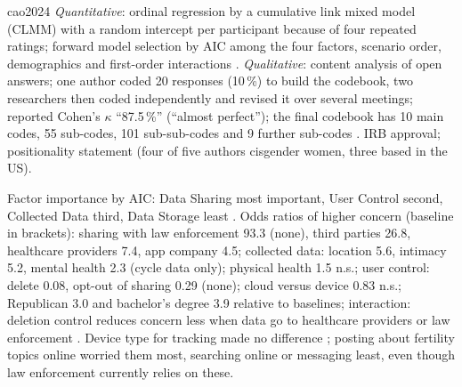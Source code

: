 \begin{papercard}{cao2024}
 \emph{Quantitative}: ordinal regression by a cumulative link mixed model (CLMM) with a random intercept per participant because of four repeated ratings; forward model selection by AIC among the four factors, scenario order, demographics and first-order interactions . \emph{Qualitative}: content analysis of open answers; one author coded 20 responses (10\,\%) to build the codebook, two researchers then coded independently and revised it over several meetings; reported Cohen's $\kappa$ ``87.5\,\%'' (``almost perfect''); the final codebook has 10 main codes, 55 sub-codes, 101 sub-sub-codes and 9 further sub-codes . IRB approval; positionality statement (four of five authors cisgender women, three based in the US).

 Factor importance by AIC: Data Sharing most important, User Control second, Collected Data third, Data Storage least . Odds ratios of higher concern (baseline in brackets): sharing with law enforcement 93.3 (none), third parties 26.8, healthcare providers 7.4, app company 4.5; collected data: location 5.6, intimacy 5.2, mental health 2.3 (cycle data only); physical health 1.5 n.s.; user control: delete 0.08, opt-out of sharing 0.29 (none); cloud versus device 0.83 n.s.; Republican 3.0 and bachelor's degree 3.9 relative to baselines; interaction: deletion control reduces concern less when data go to healthcare providers or law enforcement . Device type for tracking made no difference ; posting about fertility topics online worried them most, searching online or messaging least, even though law enforcement currently relies on these.


\end{papercard}
